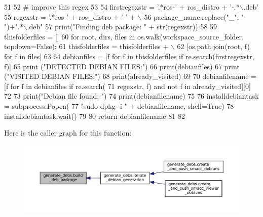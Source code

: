 \begin{DoxyCode}
51 
52     \textcolor{comment}{# improve this regex}
53 
54     firstregexstr = \textcolor{stringliteral}{'.*ros-'} + ros\_distro + \textcolor{stringliteral}{'-.*\(\backslash\).deb'}
55     regexstr = \textcolor{stringliteral}{'.*ros-'} + ros\_distro + \textcolor{stringliteral}{'-'} + \(\backslash\)
56         package\_name.replace(\textcolor{stringliteral}{"\_"}, \textcolor{stringliteral}{"-"})+\textcolor{stringliteral}{".*\(\backslash\).deb"}
57     print(\textcolor{stringliteral}{"Finding deb package: "} + str(regexstr))
58 
59     thisfolderfiles = []
60     \textcolor{keywordflow}{for} root, dirs, files \textcolor{keywordflow}{in} os.walk(workspace\_source\_folder, topdown=\textcolor{keyword}{False}):
61         thisfolderfiles = thisfolderfiles + \(\backslash\)
62             [os.path.join(root, f) \textcolor{keywordflow}{for} f \textcolor{keywordflow}{in} files]
63 
64     debianfiles = [f \textcolor{keywordflow}{for} f \textcolor{keywordflow}{in} thisfolderfiles \textcolor{keywordflow}{if} re.search(firstregexstr, f)]
65     \textcolor{keywordflow}{print} (\textcolor{stringliteral}{"DETECTED DEBIAN FILES:"})
66     print(debianfiles)
67     \textcolor{keywordflow}{print} (\textcolor{stringliteral}{"VISITED DEBIAN FILES:"})
68     print(already\_visited)
69 
70     debianfilename = [f \textcolor{keywordflow}{for} f \textcolor{keywordflow}{in} debianfiles \textcolor{keywordflow}{if} re.search(
71         regexstr, f) \textcolor{keywordflow}{and} \textcolor{keywordflow}{not} f \textcolor{keywordflow}{in} already\_visited][0]
72 
73     print(\textcolor{stringliteral}{"Debian file found: "})
74     print(debianfilename)
75 
76     installdebiantask = subprocess.Popen(
77         \textcolor{stringliteral}{"sudo dpkg -i "} + debianfilename, shell=\textcolor{keyword}{True})
78     installdebiantask.wait()
79 
80     \textcolor{keywordflow}{return} debianfilename
81 
82 
\end{DoxyCode}
Here is the caller graph for this function\+:
\nopagebreak
\begin{figure}[H]
\begin{center}
\leavevmode
\includegraphics[width=350pt]{namespacegenerate__debs_aa70c3f4917ddc57b13eaed8501f571a8_icgraph}
\end{center}
\end{figure}
\mbox{\label{namespacegenerate__debs_af7237c463c8e5b4df369e6befc154c50}} 

